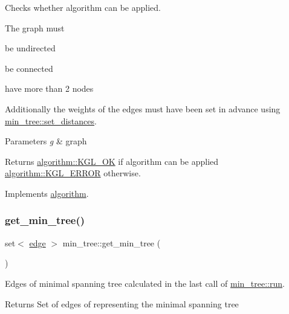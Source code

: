 Checks whether algorithm can be applied. 

The graph must
\begin{DoxyItemize}
\item be undirected
\item be connected
\item have more than 2 nodes
\end{DoxyItemize}

Additionally the weights of the edges must have been set in advance using \mbox{\hyperlink{classmin__tree_a0f3eb1714b7859576037cf4b991b16cb}{min\+\_\+tree\+::set\+\_\+distances}}.


\begin{DoxyParams}{Parameters}
{\em g} & graph \\
\hline
\end{DoxyParams}
\begin{DoxyReturn}{Returns}
\mbox{\hyperlink{classalgorithm_af1a0078e153aa99c24f9bdf0d97f6710aae4c1cd7fe8d8cf4b143241a6e7c31cf}{algorithm\+::\+K\+G\+L\+\_\+\+OK}} if algorithm can be applied \mbox{\hyperlink{classalgorithm_af1a0078e153aa99c24f9bdf0d97f6710ae67bf27b2ef31f73e545a7f9f4a69556}{algorithm\+::\+K\+G\+L\+\_\+\+E\+R\+R\+OR}} otherwise. 
\end{DoxyReturn}


Implements \mbox{\hyperlink{classalgorithm_a76361fb03ad1cf643affc51821e43bed}{algorithm}}.

\mbox{\label{classmin__tree_a9feda096e7c32a402fb91702ed3679fc}} 
\subsubsection{\texorpdfstring{get\+\_\+min\+\_\+tree()}{get\_min\_tree()}}
{\footnotesize\ttfamily set$<$ \mbox{\hyperlink{classedge}{edge}} $>$ min\+\_\+tree\+::get\+\_\+min\+\_\+tree (\begin{DoxyParamCaption}{ }\end{DoxyParamCaption})}



Edges of minimal spanning tree calculated in the last call of \mbox{\hyperlink{classmin__tree_ac025e8dad0db7a6a1e0e7b476b547802}{min\+\_\+tree\+::run}}. 

\begin{DoxyReturn}{Returns}
Set of edges of representing the minimal spanning tree 
\end{DoxyReturn}
\mbox{\label{classmin__tree_a8ca03d32ba55a9eb20b52fcb0e6fa6a5}} 
